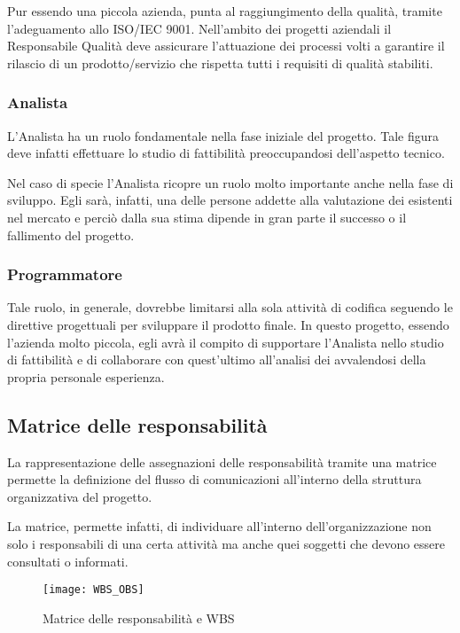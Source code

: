 Pur essendo una piccola azienda, \team punta al raggiungimento della qualità, tramite l'adeguamento allo  ISO/IEC 9001.
Nell'ambito dei progetti aziendali il Responsabile Qualità deve assicurare l'attuazione dei processi volti a garantire il rilascio di un prodotto/servizio che rispetta tutti i requisiti di qualità stabiliti.
	 
\subsubsection{Analista}
	L'Analista ha un ruolo fondamentale nella fase iniziale del progetto. Tale figura deve infatti effettuare lo studio di fattibilità preoccupandosi dell'aspetto tecnico.

Nel caso di specie l'Analista ricopre un ruolo molto importante anche nella fase di sviluppo. Egli sarà, infatti, una delle persone addette alla valutazione dei  esistenti nel mercato e perciò  dalla sua stima dipende in gran parte il successo o il fallimento del progetto.

\subsubsection{Programmatore}
	 Tale ruolo, in generale, dovrebbe limitarsi alla sola attività di codifica seguendo le direttive progettuali per sviluppare il prodotto finale. In questo progetto, essendo l'azienda molto piccola, egli avrà il compito di supportare l'Analista nello studio di fattibilità e di collaborare con quest'ultimo all'analisi dei \sw avvalendosi della propria personale esperienza.

\subsection{Matrice delle responsabilità}
La rappresentazione delle assegnazioni delle responsabilità tramite una matrice permette la definizione del flusso di comunicazioni all'interno della struttura organizzativa del progetto.

La matrice, permette infatti, di individuare all'interno dell'organizzazione non solo i responsabili di una certa attività ma anche quei soggetti che devono essere consultati o informati.

\begin{figure}[!h]
  \texttt{[image: WBS\_OBS]}
	\caption{Matrice delle responsabilità e WBS}
	\label{fig:WBS_OBS}
\end{figure} 

